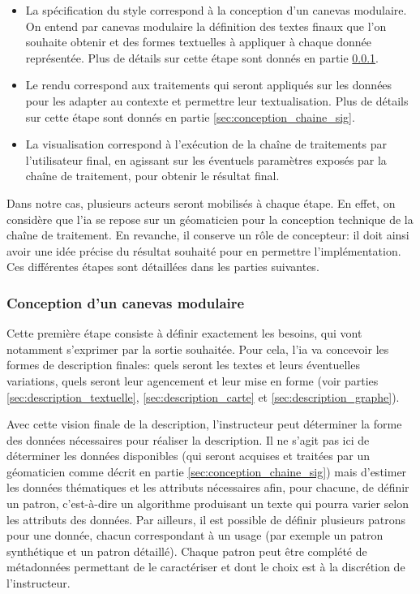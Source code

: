 \begin{itemize}
    \item La spécification du style correspond à la conception d'un canevas modulaire. On entend par canevas modulaire la définition des textes finaux que l'on souhaite obtenir et des formes textuelles à appliquer à chaque donnée représentée. Plus de détails sur cette étape sont donnés en partie \ref{sec:conception_canevas}.
    \item Le rendu correspond aux traitements qui seront appliqués sur les données pour les adapter au contexte et permettre leur textualisation. Plus de détails sur cette étape sont donnés en partie \ref{sec:conception_chaine_sig}.
    \item La visualisation correspond à l’exécution de la chaîne de traitements par l'utilisateur final, en agissant sur les éventuels paramètres exposés par la chaîne de traitement,  pour obtenir le résultat final.
\end{itemize}

Dans notre cas, plusieurs acteurs seront mobilisés à chaque étape. En effet, on considère que l’\gls{ia} se repose sur un géomaticien pour la conception technique de la chaîne de traitement. En revanche, il conserve un rôle de concepteur: il doit ainsi avoir une idée précise du résultat souhaité pour en permettre l’implémentation. Ces différentes étapes sont détaillées dans les parties suivantes.

\subsubsection{Conception d'un canevas modulaire}

\label{sec:conception_canevas}

Cette première étape consiste à définir exactement les besoins, qui vont notamment s’exprimer par la sortie souhaitée. Pour cela, l’\gls{ia} va concevoir les formes de description finales: quels seront les textes et leurs éventuelles variations, quels seront leur agencement et leur mise en forme (voir parties \ref{sec:description_textuelle}, \ref{sec:description_carte} et \ref{sec:description_graphe}).

\newpar{}

Avec cette vision finale de la description, l’instructeur peut déterminer la forme des données nécessaires pour réaliser la description. Il ne s’agit pas ici de déterminer les données disponibles (qui seront acquises et traitées par un géomaticien comme décrit en partie \ref{sec:conception_chaine_sig}) mais d’estimer les données thématiques et les attributs nécessaires afin, pour chacune, de définir un patron, c’est-à-dire un algorithme produisant un texte qui pourra varier selon les attributs des données. Par ailleurs, il est possible de définir plusieurs patrons pour une donnée, chacun correspondant à un usage (par exemple un patron synthétique et un patron détaillé). Chaque patron peut être complété de métadonnées permettant de le caractériser et dont le choix est à la discrétion de l’instructeur.

